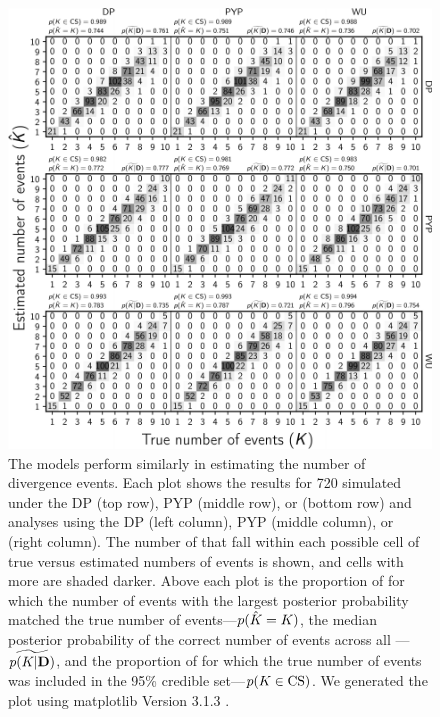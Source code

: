 \begin{figure}[htbp]
    \begin{center}
        \includegraphics[width=\textwidth,height=\textheight,keepaspectratio]{../images/from-project-repo/infer-columns-by-data-rows-nevents-cropped-rasterized.pdf}
        \captionsetup{name=Figure S, labelformat=noSpace, listformat=sFigList}
        \caption{
        The models perform similarly in estimating the number of divergence
        events.
        Each plot shows the results for 720 \datasets
        simulated under the
        DP (top row),
        PYP (middle row),
        or
        \wunif (bottom row)
        and analyses using the
        DP (left column),
        PYP (middle column),
        or
        \wunif (right column).
        The number of \datasets that fall within each possible cell of true
        versus estimated numbers of events is shown, and cells with more
        \datasets are shaded darker.
        Above each plot is
        the proportion of \datasets for which the number of events with the largest
        posterior probability matched the true number of events---$p(\hat{K_{}}
        = K_{})$,
        the median posterior probability of the correct number of events across all
        \datasets---$\widetilde{p(K_{}|\mathbf{D})}$, and
        the proportion of \datasets for which the true number of events was
        included in the 95\% credible set---$p(K_{} \in
        \textrm{CS})$.
        We generated the plot using matplotlib Version 3.1.3
        \citep{matplotlib}.
        }
        \label{fig:neventsgrid}
    \end{center}
\end{figure}

